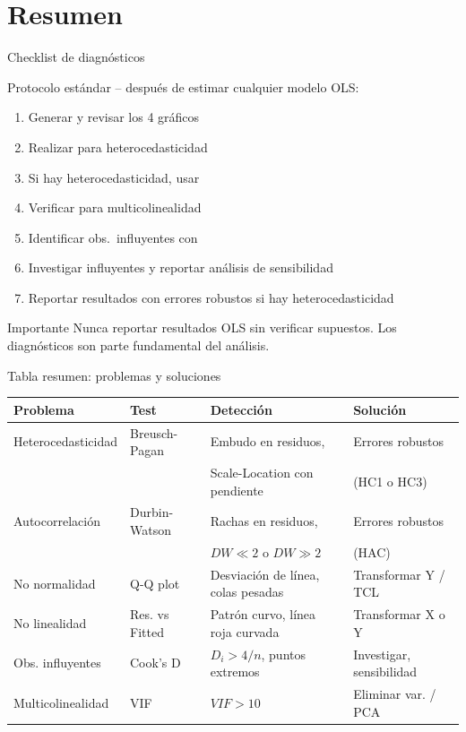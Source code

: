 \documentclass[aspectratio=169, 11pt]{beamer}
\begin{document}
\section{Resumen}

\begin{frame}{Checklist de diagnósticos}
\begin{block}{Protocolo estándar -- después de estimar cualquier modelo OLS:}
\begin{enumerate}
\item Generar  y revisar los 4 gráficos
\item Realizar  para heterocedasticidad
\item Si hay heterocedasticidad, usar 
\item Verificar  para multicolinealidad
\item Identificar obs.\ influyentes con 
\item Investigar influyentes y reportar análisis de sensibilidad
\item Reportar resultados con errores robustos si hay heterocedasticidad
\end{enumerate}
\end{block}

\vspace{0.1cm}
\begin{alertblock}{Importante}
Nunca reportar resultados OLS sin verificar supuestos. Los diagnósticos son parte fundamental del análisis.
\end{alertblock}
\end{frame}

\begin{frame}{Tabla resumen: problemas y soluciones}
\footnotesize
\begin{center}
\renewcommand{\arraystretch}{1.2}
\begin{tabular}{llll}
\toprule
\textbf{Problema} & \textbf{Test} & \textbf{Detección} & \textbf{Solución} \\
\midrule
Heterocedasticidad & Breusch-Pagan & Embudo en residuos, & Errores robustos \\
 &  & Scale-Location con pendiente & (HC1 o HC3) \\
\midrule
Autocorrelación & Durbin-Watson & Rachas en residuos, & Errores robustos \\
 &  & $DW \ll 2$ o $DW \gg 2$ & (HAC) \\
\midrule
No normalidad & Q-Q plot & Desviación de línea, colas pesadas & Transformar Y / TCL \\
\midrule
No linealidad & Res. vs Fitted & Patrón curvo, línea roja curvada & Transformar X o Y \\
\midrule
Obs. influyentes & Cook's D & $D_i > 4/n$, puntos extremos & Investigar, sensibilidad \\
\midrule
Multicolinealidad & VIF & $VIF > 10$ & Eliminar var. / PCA \\
\bottomrule
\end{tabular}
\end{center}
\end{frame}
\end{document}
